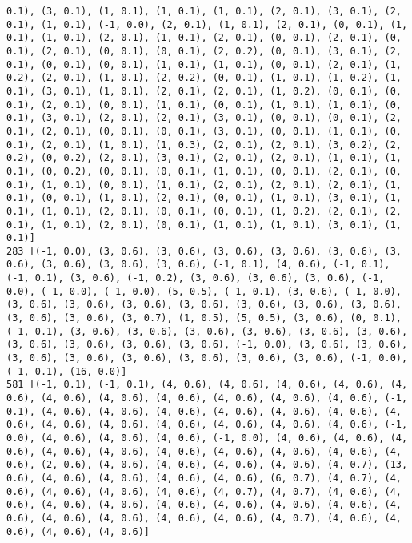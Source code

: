 \documentclass[11pt]{article}
\begin{document}
\begin{Verbatim}[commandchars=\\\{\}]
0.1), (3, 0.1), (1, 0.1), (1, 0.1), (1, 0.1), (2, 0.1), (3, 0.1), (2, 0.1), (1, 0.1), (-1, 0.0), (2, 0.1), (1, 0.1), (2, 0.1), (0, 0.1), (1, 0.1), (1, 0.1), (2, 0.1), (1, 0.1), (2, 0.1), (0, 0.1), (2, 0.1), (0, 0.1), (2, 0.1), (0, 0.1), (0, 0.1), (2, 0.2), (0, 0.1), (3, 0.1), (2, 0.1), (0, 0.1), (0, 0.1), (1, 0.1), (1, 0.1), (0, 0.1), (2, 0.1), (1, 0.2), (2, 0.1), (1, 0.1), (2, 0.2), (0, 0.1), (1, 0.1), (1, 0.2), (1, 0.1), (3, 0.1), (1, 0.1), (2, 0.1), (2, 0.1), (1, 0.2), (0, 0.1), (0, 0.1), (2, 0.1), (0, 0.1), (1, 0.1), (0, 0.1), (1, 0.1), (1, 0.1), (0, 0.1), (3, 0.1), (2, 0.1), (2, 0.1), (3, 0.1), (0, 0.1), (0, 0.1), (2, 0.1), (2, 0.1), (0, 0.1), (0, 0.1), (3, 0.1), (0, 0.1), (1, 0.1), (0, 0.1), (2, 0.1), (1, 0.1), (1, 0.3), (2, 0.1), (2, 0.1), (3, 0.2), (2, 0.2), (0, 0.2), (2, 0.1), (3, 0.1), (2, 0.1), (2, 0.1), (1, 0.1), (1, 0.1), (0, 0.2), (0, 0.1), (0, 0.1), (1, 0.1), (0, 0.1), (2, 0.1), (0, 0.1), (1, 0.1), (0, 0.1), (1, 0.1), (2, 0.1), (2, 0.1), (2, 0.1), (1, 0.1), (0, 0.1), (1, 0.1), (2, 0.1), (0, 0.1), (1, 0.1), (3, 0.1), (1, 0.1), (1, 0.1), (2, 0.1), (0, 0.1), (0, 0.1), (1, 0.2), (2, 0.1), (2, 0.1), (1, 0.1), (2, 0.1), (0, 0.1), (1, 0.1), (1, 0.1), (3, 0.1), (1, 0.1)]
283 [(-1, 0.0), (3, 0.6), (3, 0.6), (3, 0.6), (3, 0.6), (3, 0.6), (3, 0.6), (3, 0.6), (3, 0.6), (3, 0.6), (-1, 0.1), (4, 0.6), (-1, 0.1), (-1, 0.1), (3, 0.6), (-1, 0.2), (3, 0.6), (3, 0.6), (3, 0.6), (-1, 0.0), (-1, 0.0), (-1, 0.0), (5, 0.5), (-1, 0.1), (3, 0.6), (-1, 0.0), (3, 0.6), (3, 0.6), (3, 0.6), (3, 0.6), (3, 0.6), (3, 0.6), (3, 0.6), (3, 0.6), (3, 0.6), (3, 0.7), (1, 0.5), (5, 0.5), (3, 0.6), (0, 0.1), (-1, 0.1), (3, 0.6), (3, 0.6), (3, 0.6), (3, 0.6), (3, 0.6), (3, 0.6), (3, 0.6), (3, 0.6), (3, 0.6), (3, 0.6), (-1, 0.0), (3, 0.6), (3, 0.6), (3, 0.6), (3, 0.6), (3, 0.6), (3, 0.6), (3, 0.6), (3, 0.6), (-1, 0.0), (-1, 0.1), (16, 0.0)]
581 [(-1, 0.1), (-1, 0.1), (4, 0.6), (4, 0.6), (4, 0.6), (4, 0.6), (4, 0.6), (4, 0.6), (4, 0.6), (4, 0.6), (4, 0.6), (4, 0.6), (4, 0.6), (-1, 0.1), (4, 0.6), (4, 0.6), (4, 0.6), (4, 0.6), (4, 0.6), (4, 0.6), (4, 0.6), (4, 0.6), (4, 0.6), (4, 0.6), (4, 0.6), (4, 0.6), (4, 0.6), (-1, 0.0), (4, 0.6), (4, 0.6), (4, 0.6), (-1, 0.0), (4, 0.6), (4, 0.6), (4, 0.6), (4, 0.6), (4, 0.6), (4, 0.6), (4, 0.6), (4, 0.6), (4, 0.6), (4, 0.6), (2, 0.6), (4, 0.6), (4, 0.6), (4, 0.6), (4, 0.6), (4, 0.7), (13, 0.6), (4, 0.6), (4, 0.6), (4, 0.6), (4, 0.6), (6, 0.7), (4, 0.7), (4, 0.6), (4, 0.6), (4, 0.6), (4, 0.6), (4, 0.7), (4, 0.7), (4, 0.6), (4, 0.6), (4, 0.6), (4, 0.6), (4, 0.6), (4, 0.6), (4, 0.6), (4, 0.6), (4, 0.6), (4, 0.6), (4, 0.6), (4, 0.6), (4, 0.6), (4, 0.7), (4, 0.6), (4, 0.6), (4, 0.6), (4, 0.6)]

\end{Verbatim}
\end{document}
